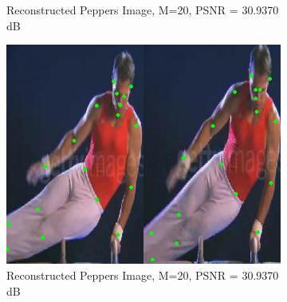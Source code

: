 \documentclass[conference]{IEEEtran}
\begin{document}
\begin{figure}[htbp]{}
\begin{subfigure}[t]{2cm}
\caption{Reconstructed Peppers Image, M=20, PSNR = 30.9370 dB} 
\label{caro1}
\end{subfigure}
\hfill %
\begin{subfigure}[t]{2cm}
\includegraphics[width=\linewidth, height=1.2\linewidth]{dm1}
\caption{Reconstructed Peppers Image, M=20, PSNR = 30.9370 dB} 
\label{caro2}
\end{subfigure}
\hfill %
\begin{subfigure}[t]{2cm}

\end{subfigure}
\end{figure}
\end{document}
